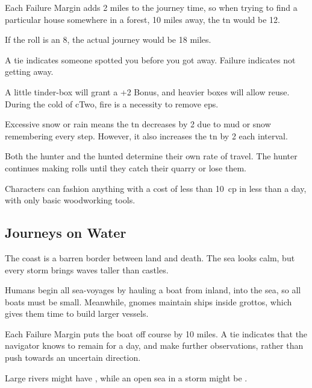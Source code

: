 \begin{multicols}{2}
\begin{multicols}{2}
Each Failure Margin adds 2 miles to the journey time, so when trying to find a particular house somewhere in a forest, 10 miles away, the \gls{tn} would be 12.
\end{multicols}
\noindent
If the roll is an 8, the actual journey would be 18 miles.

A tie indicates someone spotted you before you got away.
Failure indicates not getting away.

A little tinder-box will grant a +2 Bonus, and heavier boxes will allow reuse.
During the cold of \gls{cTwo}, fire is a necessity to remove \glspl{ep}.

Excessive snow or rain means the \gls{tn} decreases by 2 due to mud or snow remembering every step.
However, it also increases the \gls{tn} by 2 each \gls{interval}.

Both the hunter and the hunted determine their own rate of travel.
The hunter continues making rolls until they catch their quarry or lose them.

Characters can fashion anything with a cost of less than 10~\gls{cp} in less than a day, with only basic woodworking tools.

\subsection{Journeys on Water}

The coast is a barren border between land and death.
The sea looks calm, but every \gls{storm} brings waves taller than castles.

Humans begin all sea-voyages by hauling a boat from inland, into the sea, so all boats must be small.
Meanwhile, gnomes maintain ships inside grottos, which gives them time to build larger vessels.


Each Failure Margin puts the boat off course by 10 miles.
A tie indicates that the navigator knows to remain for a day, and make further observations, rather than push towards an uncertain direction.

Large rivers might have \tn[8], while an open sea in a storm might be \tn[12].


\end{multicols}
